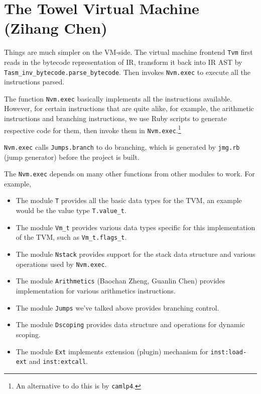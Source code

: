 \documentclass{report}
\newcommand{\inst}[1] {\texttt{inst:#1}}
\begin{document}
\section{The Towel Virtual Machine (Zihang Chen)}

Things are much simpler on the VM-side. The virtual machine frontend \texttt{Tvm} first reads in the bytecode representation of IR, transform it back into IR AST by \texttt{Tasm\_inv\_bytecode.parse\_bytecode}. Then invokes \texttt{Nvm.exec} to execute all the instructions parsed.

The function \texttt{Nvm.exec} basically implements all the instructions available. However, for certain instructions that are quite alike, for example, the arithmetic instructions and branching instructions, we use Ruby scripts to generate respective code for them, then invoke them in \texttt{Nvm.exec}.\footnote{An alternative to do this is by \texttt{camlp4}.}

\begin{mdframed}[style=example]
  \texttt{Nvm.exec} calls \texttt{Jumps.branch} to do branching, which is generated by \texttt{jmg.rb} (jump generator) before the project is built.
\end{mdframed}

\begin{mdframed}[style=detail]
The \texttt{Nvm.exec} depends on many other functions from other modules to work. For example,

\begin{itemize}
\item The module \texttt{T} provides all the basic data types for the TVM, an example would be the value type \texttt{T.value\_t}.

\item The module \texttt{Vm\_t} provides various data types specific for this implementation of the TVM, such as \texttt{Vm\_t.flags\_t}.

\item The module \texttt{Nstack} provides support for the stack data
  structure and various operations used by \texttt{Nvm.exec}.

\item The module \texttt{Arithmetics} (Baochan Zheng, Guanlin Chen) provides implementation for various arithmetics instructions.

\item The module \texttt{Jumps} we've talked above provides branching control.

\item The module \texttt{Dscoping} provides data structure and operations for dynamic scoping.

\item The module \texttt{Ext} implements extension (plugin) mechanism for \inst{load-ext} and \inst{extcall}.
\end{itemize}
\end{mdframed}
\end{document}
